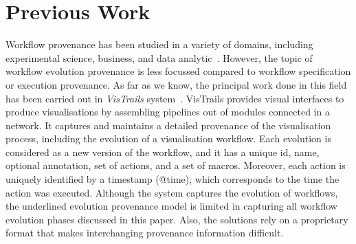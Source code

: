 \documentclass[ao]{iosart2x}
\begin{document}
\section{Previous Work}
\label{sec:pre_work}
Workflow provenance has been studied in a variety of domains, including experimental science, business, and data analytic~\citep{herschel2017survey}. However, the topic of workflow evolution provenance is less focussed compared to workflow specification or execution provenance. As far as we know, the principal work done in this field has been carried out in \textit{VisTrails} system~\citep{freire2006managing, koop2010provenance}. VisTrails provides visual
interfaces to produce visualisations by assembling pipelines out of modules connected in a network. It captures and maintains a detailed provenance of the visualisation process, including the evolution of a visualisation workflow. %
Each evolution is considered as a new version of the workflow, and it has a unique id, name, optional annotation, set of actions, and a set of macros. 
Moreover, each action is uniquely identified by a timestamp (@time), which corresponds to the time the action was executed. Although the system captures the evolution of workflows, the underlined evolution provenance model is limited in capturing all workflow evolution phases discussed in this paper. Also, the solutions rely on a proprietary format that makes interchanging provenance information difficult. 
\end{document}
